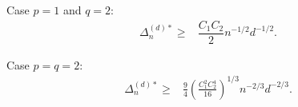 Case $p=1$ and $q=2$:
\begin{align*}
\Delta_n^{(d)*}  \ge& \dfrac{C_1 C_2}{2} n^{-1/2} d^{-1/2}.
\end{align*}

Case $p=q=2$:
\begin{align*}
\Delta_n^{(d)*}  \ge& \frac{9}{4}\left(\frac{C_1^2 C_2^4}{16}\right)^{1/3} n^{-2/3} d^{-2/3}.
\end{align*}
